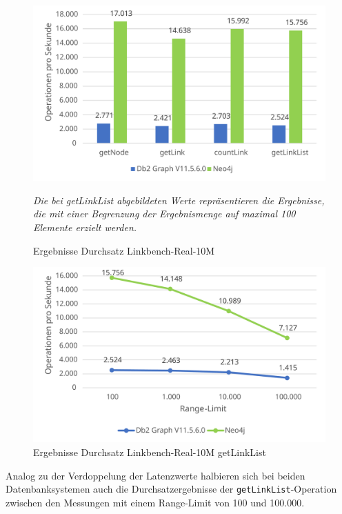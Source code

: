 \begin{figure}[!b]
    \centering
    \includegraphics[width=\textwidth]{images/diagramme/linkbench_10m_real_durchsatz.pdf}
    \caption{Ergebnisse Durchsatz Linkbench-Real-10M}
    \label{fig:durchsatz:linkbench_10m_real}
    \vspace{1em}
    \textit{Die bei getLinkList abgebildeten Werte repräsentieren die Ergebnisse, die mit einer Begrenzung der Ergebnismenge auf maximal 100 Elemente erzielt werden.}
\end{figure}

\begin{figure}[!b]
    \centering
    \includegraphics[width=\textwidth]{images/diagramme/limit_absolute_durchsatz_real_10m.pdf}
    \caption{Ergebnisse Durchsatz Linkbench-Real-10M getLinkList}
    \label{fig:durchsatz:linkbench_10m_real:rl}
\end{figure}

Analog zu der Verdoppelung der Latenzwerte halbieren sich bei beiden
Datenbanksystemen auch die Durchsatzergebnisse der \texttt{getLinkList}-Ope\-ra\-ti\-on zwischen den Messungen mit einem Range-Limit von 100 und 100.000.


